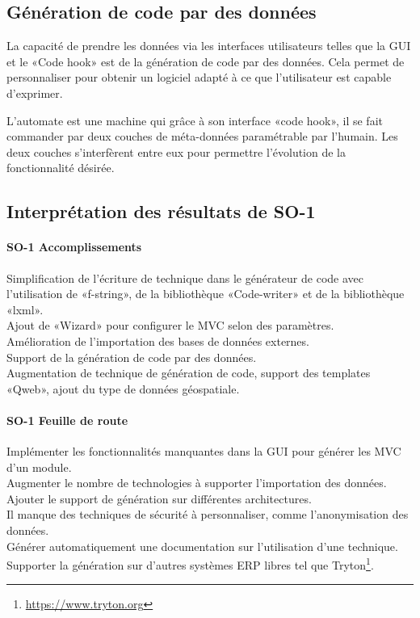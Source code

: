 \subsection{Génération de code par des données}

La capacité de prendre les données via les interfaces utilisateurs telles que la GUI et le «Code hook» est de la génération de code par des données. Cela permet de personnaliser pour obtenir un logiciel adapté à ce que l’utilisateur est capable d’exprimer.

L’automate est une machine qui grâce à son interface «code hook», il se fait commander par deux couches de méta-données paramétrable par l’humain. Les deux couches s’interfèrent entre eux pour permettre l’évolution de la fonctionnalité désirée.


\subsection{Interprétation des résultats de SO-1}

\paragraph{SO-1 Accomplissements}
Simplification de l’écriture de technique dans le générateur de code avec l’utilisation de «f-string», de la bibliothèque «Code-writer» et de la bibliothèque «lxml».\\
Ajout de «Wizard» pour configurer le MVC selon des paramètres.\\
Amélioration de l’importation des bases de données externes.\\
Support de la génération de code par des données.\\
Augmentation de technique de génération de code, support des templates «Qweb», ajout du type de données géospatiale.

\paragraph{SO-1 Feuille de route}
Implémenter les fonctionnalités manquantes dans la GUI pour générer les MVC d’un module.\\
Augmenter le nombre de technologies à supporter l'importation des données.\\
Ajouter le support de génération sur différentes architectures.\\
Il manque des techniques de sécurité à personnaliser, comme l’anonymisation des données.\\
Générer automatiquement une documentation sur l’utilisation d’une technique. \\
Supporter la génération sur d’autres systèmes ERP libres tel que Tryton\footnote{\url{https://www.tryton.org}}.

